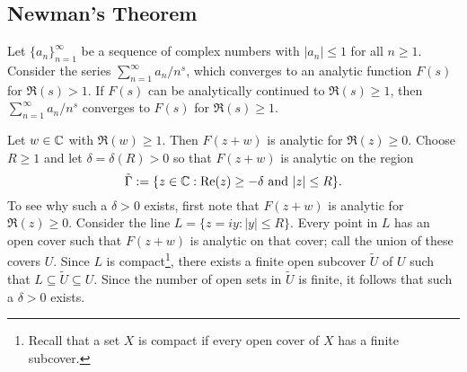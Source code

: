 \subsection{Newman's Theorem}\label{subsec:3.2}

\begin{thm}[Newman]\label{thm:3.5}
Let $\{a_n\}_{n=1}^\infty$ be a sequence of complex numbers with $|a_n| \leq 1$ for all $n \geq 1$. 
Consider the series $\sum_{n=1}^\infty a_n/n^s$, which converges to an analytic function 
$F(s)$ for $\Re(s) > 1$. If $F(s)$ can be analytically continued to $\Re(s) \geq 1$, then 
$\sum_{n=1}^\infty a_n/n^s$ converges to $F(s)$ for $\Re(s) \geq 1$. 
\end{thm}
\begin{pf}
Let $w \in \mathbb{C}$ with $\Re(w) \geq 1$. Then $F(z+w)$ is analytic for $\Re(z) \geq 0$. Choose 
$R \geq 1$ and let $\delta = \delta(R) > 0$ so that $F(z+w)$ is analytic on the region 
\[ \tilde\Gamma := \{z \in \mathbb{C} : {\rm Re}(z) \geq -\delta \text{ and } |z| \leq R\}. \]
To see why such a $\delta > 0$ exists, first note that $F(z+w)$ is analytic for $\Re(z) \geq 0$. 
Consider the line $L = \{z = iy : |y| \leq R\}$. Every point in $L$ has an open cover such that 
$F(z+w)$ is analytic on that cover; call the union of these covers $U$. Since $L$ is compact\footnote{Recall that a set $X$ is compact if every open cover of $X$ has a finite subcover.}, there exists a finite open subcover $\tilde U$ of $U$ such that 
$L \subseteq \tilde U \subseteq U$. Since the number of open sets in $\tilde U$ is finite, 
it follows that such a $\delta > 0$ exists.


\end{pf}
